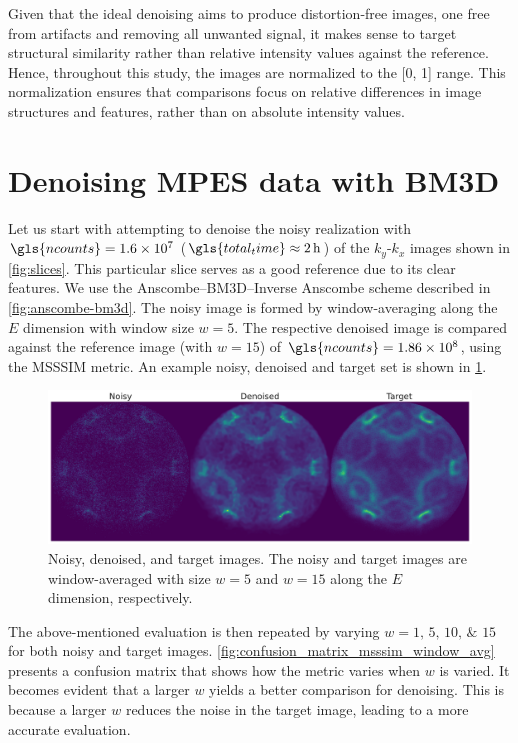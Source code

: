 Given that the ideal denoising aims to produce distortion-free images, one free from artifacts and removing all unwanted signal, it makes sense to target structural similarity rather than relative intensity values against the reference. Hence, throughout this study, the images are normalized to the [\num{0}, \num{1}] range. This normalization ensures that comparisons focus on relative differences in image structures and features, rather than on absolute intensity values.

\section{Denoising MPES data with BM3D}
Let us start with attempting to denoise the noisy realization with $\gls{ncounts}=\num{1.6e7}$ ($\gls{total_time}\approx\qty{2}{h}$) of the $k_y$-$k_x$ images shown in \cref{fig:slices}. This particular slice serves as a good reference due to its clear features. We use the Anscombe--\gls{BM3D}--Inverse Anscombe scheme described in \cref{fig:anscombe-bm3d}. The noisy image is formed by window-averaging along the $E$ dimension with window size $w = 5$. The respective denoised image is compared against the reference image (with $w=15$) of $\gls{ncounts}=\num{1.86e8}$, using the \gls{MSSSIM} metric. An example noisy, denoised and target set is shown in \cref{fig:noisy-denoised-ref-16M-avg-bm3d}. 

\begin{figure}
    \centering
    \includegraphics[width=1\linewidth]{images/noisy_denoised_ref_16M_avg_bm3d.pdf}
    \caption{Noisy, denoised, and target images. The noisy and target images are window-averaged with size $w=5$ and $w=15$ along the $E$ dimension, respectively.}
    \label{fig:noisy-denoised-ref-16M-avg-bm3d}
\end{figure}

The above-mentioned evaluation is then repeated by varying $w = \numlist{1;5;10;15}$ for both noisy and target images. \cref{fig:confusion_matrix_msssim_window_avg} presents a confusion matrix that shows how the metric varies when $w$ is varied. It becomes evident that a larger $w$ yields a better comparison for denoising. This is because a larger $w$ reduces the noise in the target image, leading to a more accurate evaluation.

